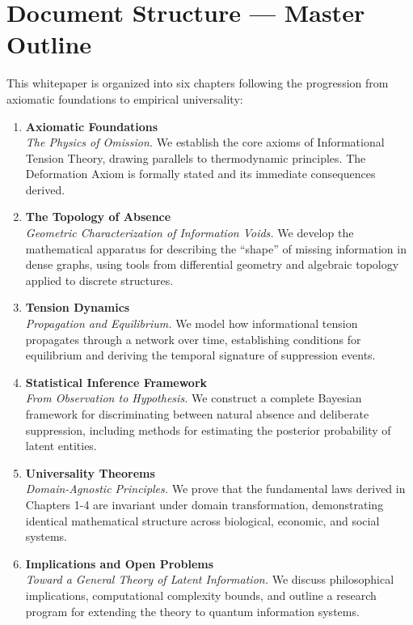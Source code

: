 \documentclass[12pt,a4paper]{article}
\theoremstyle{definition}
\theoremstyle{remark}
\begin{document}

\section*{Document Structure — Master Outline}

\noindent This whitepaper is organized into six chapters following the progression from axiomatic foundations to empirical universality:

\begin{enumerate}[label=\textbf{Chapter \arabic*:}, leftmargin=2.5cm, itemsep=0.5em]
    \item \textbf{Axiomatic Foundations} \\
    \textit{The Physics of Omission.} We establish the core axioms of Informational Tension Theory, drawing parallels to thermodynamic principles. The Deformation Axiom is formally stated and its immediate consequences derived.
    
    \item \textbf{The Topology of Absence} \\
    \textit{Geometric Characterization of Information Voids.} We develop the mathematical apparatus for describing the ``shape'' of missing information in dense graphs, using tools from differential geometry and algebraic topology applied to discrete structures.
    
    \item \textbf{Tension Dynamics} \\
    \textit{Propagation and Equilibrium.} We model how informational tension propagates through a network over time, establishing conditions for equilibrium and deriving the temporal signature of suppression events.
    
    \item \textbf{Statistical Inference Framework} \\
    \textit{From Observation to Hypothesis.} We construct a complete Bayesian framework for discriminating between natural absence and deliberate suppression, including methods for estimating the posterior probability of latent entities.
    
    \item \textbf{Universality Theorems} \\
    \textit{Domain-Agnostic Principles.} We prove that the fundamental laws derived in Chapters 1-4 are invariant under domain transformation, demonstrating identical mathematical structure across biological, economic, and social systems.
    
    \item \textbf{Implications and Open Problems} \\
    \textit{Toward a General Theory of Latent Information.} We discuss philosophical implications, computational complexity bounds, and outline a research program for extending the theory to quantum information systems.
\end{enumerate}
\end{document}
